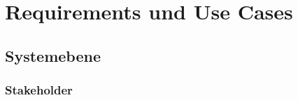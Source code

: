 \chapter{Requirements und Use Cases}\label{ch:requirements-und-use-cases}


\section{Systemebene}\label{sec:systemebene}


\subsection{Stakeholder}\label{subsec:stakeholder}

